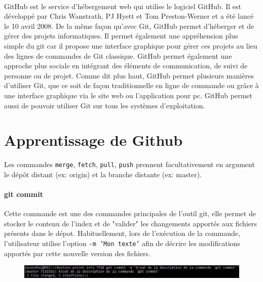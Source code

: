 \documentclass[11pt,canadien]{article}
\begin{document}
\paragraph{} GitHub est le service d'hébergement web qui utilise le logiciel GitHub. Il est développé par Chris Wanstrath, PJ Hyett et Tom Preston-Werner et a été lancé le 10 avril 2008. De la même façon qu'avec Git, GitHub permet d'héberger et de gérer des projets informatiques. Il permet également une appréhension plus simple du git car il propose une interface graphique pour gérer ces projets au lieu des lignes de commandes de Git classique. GitHub permet également une approche plus sociale en intégrant des éléments de communication, de suivi de personne ou de projet. Comme dit plus haut, GitHub permet plusieurs manières d'utiliser Git, que ce soit de façon traditionnelle en ligne de commande ou grâce à une interface graphique via le site web ou l'application pour pc. GitHub permet aussi de pouvoir utiliser Git sur tous les systèmes d'exploitation.

\section{Apprentissage de Github}
Les commandes \texttt{merge}, \texttt{fetch}, \texttt{pull}, \texttt{push} prennent facultativement en argument le dépôt distant (ex: origin) et la branche distante (ex: master).

\paragraph{git commit}Cette commande est une des commandes principales de l'outil git, elle permet de stocker le contenu de l'index et de "valider" les changements apportés aux fichiers présents dans le dépot. Habituellement, lors de l'exécution de la commande, l'utilisateur utilise l'option \texttt{-m 'Mon texte'} afin de décrire les modifications apportés par cette nouvelle version des fichiers.
\begin{figure}[H]
	\centering
	\includegraphics[width=\textwidth]{images/git_commit.jpg}
\end{figure}
\end{document}
